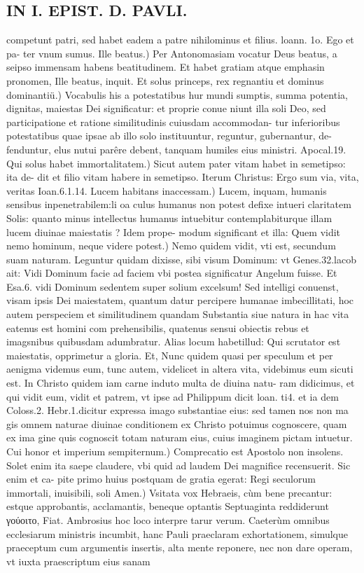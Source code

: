 \documentclass{article}
\begin{document}
\begin{pages}
\section*{IN I. EPIST. D. PAVLI. }
\marginpar{[ p.130 ]}\pstart competunt patri, sed habet eadem a patre nihilominus et filius. loann. 1o. Ego et pa- ter vnum sumus.  \pend\pstart Ille beatus.) Per Antonomasiam vocatur Deus beatus, a seipso immensam habens beatitudinem. Et habet gratiam atque emphasin pronomen, Ille beatus, inquit.  \pend\pstart Et solus princeps, rex regnantiu et dominus dominantiü.) Vocabulis his a potestatibus hur mundi sumptis, summa potentia, dignitas, maiestas Dei significatur: et proprie conue niunt illa soli Deo, sed participatione et ratione similitudinis cuiusdam accommodan- tur inferioribus potestatibus quae ipsae ab illo solo instituuntur, reguntur, gubernantur, de- fenduntur, elus nutui parêre debent, tanquam humiles eius ministri. Apocal.19.  \pend\pstart Qui solus habet immortalitatem.) Sicut autem pater vitam habet in semetipso: ita de- dit et filio vitam habere in semetipso. Iterum Christus: Ergo sum via, vita, veritas Ioan.6.1.14.  \pend\pstart Lucem habitans inaccessam.) Lucem, inquam, humanis sensibus inpenetrabilem:li oa culus humanus non potest defixe intueri claritatem Solis: quanto minus intellectus humanus intuebitur contemplabiturque illam lucem diuinae maiestatis ? Idem prope- modum significant et illa:  \pend\pstart Quem vidit nemo hominum, neque videre potest.) Nemo quidem vidit, vti est, secundum suam naturam. Leguntur quidam dixisse, sibi visum Dominum: vt Genes.32.lacob ait: Vidi Dominum facie ad faciem vbi postea significatur Angelum fuisse. Et Esa.6. vidi Dominum sedentem super solium excelsum! Sed intelligi conuenst, visam ipsis Dei maiestatem, quantum datur percipere humanae imbecillitati, hoc autem perspeciem et similitudinem quandam Substantia siue natura in hac vita eatenus est homini com prehensibilis, quatenus sensui obiectis rebus et imagsnibus quibusdam adumbratur. Alias locum habetillud: Qui scrutator est maiestatis, opprimetur a gloria. Et, Nunc quidem quasi per speculum et per aenigma videmus eum, tunc autem, videlicet in altera vita, videbimus eum sicuti est. In Christo quidem iam carne induto multa de diuina natu- ram didicimus, et qui vidit eum, vidit et patrem, vt ipse ad Philippum dicit loan. ti4. et ia dem Coloss.2. Hebr.1.dicitur expressa imago substantiae eius: sed tamen nos non ma gis omnem naturae diuinae conditionem ex Christo potuimus cognoscere, quam ex ima gine quis cognoscit totam naturam eius, cuius imaginem pictam intuetur.  \pend\pstart Cui honor et imperium sempiternum.) Comprecatio est Apostolo non insolens. Solet enim ita saepe claudere, vbi quid ad laudem Dei magnifice recensuerit. Sic enim et ca- pite primo huius postquam de gratia egerat: Regi seculorum immortali, inuisibili, soli  \pend\pstart Amen.) Vsitata vox Hebraeis, cùm bene precantur: estque approbantis, acclamantis, beneque optantis Septuaginta reddiderunt γούοιτο, Fiat. Ambrosius hoc loco interpre tarur verum. Caeterùm omnibus ecclesiarum ministris incumbit, hanc Pauli praeclaram exhortationem, simulque praeceptum cum argumentis insertis, alta mente reponere, nec non dare operam, vt iuxta praescriptum eius sanam 
\end{pages}
\end{document}
